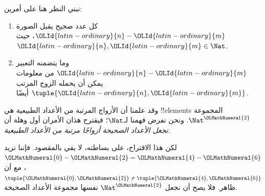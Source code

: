 \documentclass[../../../include/open-logic-section]{subfiles}
\begin{document}

نبني النظر هنا على أمرين:
\begin{enumerate}
\item كل عدد صحيح يقبل الصورة ${\OLId{latin-ordinary}{n}} - {\OLId{latin-ordinary}{m}}$، حيث ${\OLId{latin-ordinary}{n}}, {\OLId{latin-ordinary}{m}} \in\Nat$.
\item وما يتضمنه التعبير ${\OLId{latin-ordinary}{n}} - {\OLId{latin-ordinary}{m}}$ من معلومات يمكن أن يحمله الزوج المرتب $\tuple{{\OLId{latin-ordinary}{n}}, {\OLId{latin-ordinary}{m}}}$ أيضًا.
\end{enumerate}
وقد علمنا أن الأزواج المرتبة من الأعداد الطبيعية هي !!{element}s المجموعة $\Nat^{\OLMathNumeral{2}}$. ونحن نفرض فهمنا لـ$\Nat$؛ فيقترح هذان الأمران أول وهلة أن \emph{نجعل الأعداد الصحيحة أزواجًا مرتبة من الأعداد الطبيعية}.

لكن هذا الاقتراح، على بساطته، لا يفي بالمقصود. فإننا نريد ${\OLMathNumeral{0}}- {\OLMathNumeral{2}} = {\OLMathNumeral{4}} - {\OLMathNumeral{6}}$، مع أن $\tuple{{\OLMathNumeral{0}}, {\OLMathNumeral{2}} }\neq \tuple{{\OLMathNumeral{4}}, {\OLMathNumeral{6}}}$ ظاهر. فلا يصح أن نجعل $\Nat^{\OLMathNumeral{2}}$ نفسها مجموعة الأعداد الصحيحة.
\end{document}
